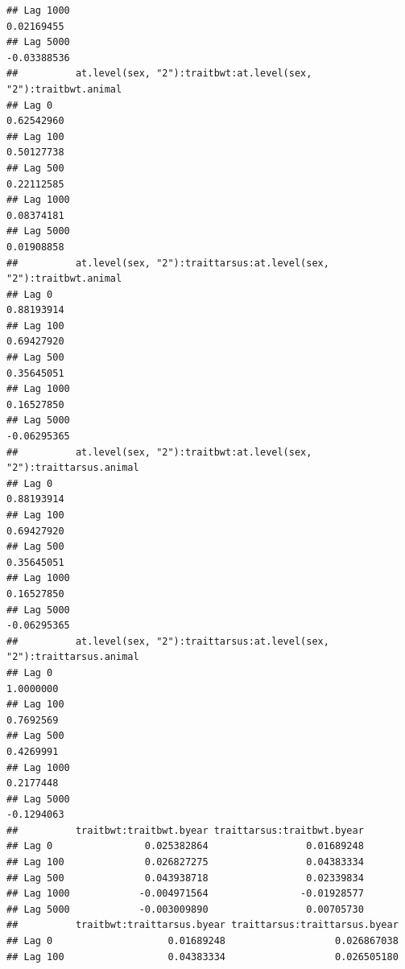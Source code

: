 \documentclass[
  12pt,
]{book}
\begin{document}
\begin{verbatim}
## Lag 1000                                                           0.02169455
## Lag 5000                                                          -0.03388536
##          at.level(sex, "2"):traitbwt:at.level(sex, "2"):traitbwt.animal
## Lag 0                                                        0.62542960
## Lag 100                                                      0.50127738
## Lag 500                                                      0.22112585
## Lag 1000                                                     0.08374181
## Lag 5000                                                     0.01908858
##          at.level(sex, "2"):traittarsus:at.level(sex, "2"):traitbwt.animal
## Lag 0                                                           0.88193914
## Lag 100                                                         0.69427920
## Lag 500                                                         0.35645051
## Lag 1000                                                        0.16527850
## Lag 5000                                                       -0.06295365
##          at.level(sex, "2"):traitbwt:at.level(sex, "2"):traittarsus.animal
## Lag 0                                                           0.88193914
## Lag 100                                                         0.69427920
## Lag 500                                                         0.35645051
## Lag 1000                                                        0.16527850
## Lag 5000                                                       -0.06295365
##          at.level(sex, "2"):traittarsus:at.level(sex, "2"):traittarsus.animal
## Lag 0                                                               1.0000000
## Lag 100                                                             0.7692569
## Lag 500                                                             0.4269991
## Lag 1000                                                            0.2177448
## Lag 5000                                                           -0.1294063
##          traitbwt:traitbwt.byear traittarsus:traitbwt.byear
## Lag 0                0.025382864                 0.01689248
## Lag 100              0.026827275                 0.04383334
## Lag 500              0.043938718                 0.02339834
## Lag 1000            -0.004971564                -0.01928577
## Lag 5000            -0.003009890                 0.00705730
##          traitbwt:traittarsus.byear traittarsus:traittarsus.byear
## Lag 0                    0.01689248                   0.026867038
## Lag 100                  0.04383334                   0.026505180

\end{verbatim}
\end{document}
